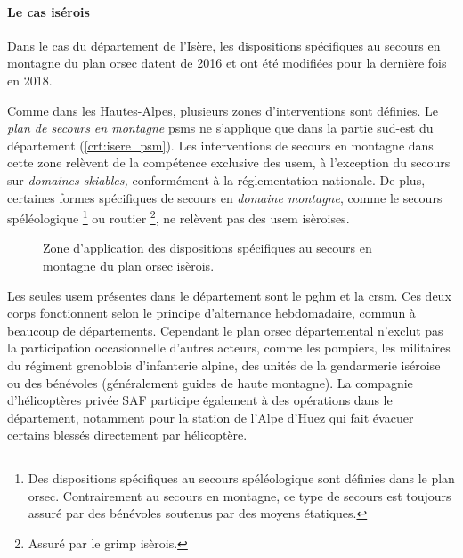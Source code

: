 \paragraph{Le cas isérois}

Dans le cas du département de l'Isère, les dispositions spécifiques au
secours en montagne du plan \ac{orsec} datent de 2016 et ont été
modifiées pour la dernière fois en 2018.

Comme dans les Hautes-Alpes, plusieurs zones d'interventions sont
définies. Le \emph{plan de secours en montagne} \acp{psm} ne
s'applique que dans la partie sud-est du département
(\autoref{crt:isere_psm}). Les interventions de secours en montagne
dans cette zone relèvent de la compétence exclusive des \ac{usem}, à
l'exception du secours sur \emph{domaines skiables,} conformément à la
réglementation nationale. De plus, certaines formes spécifiques de
secours en \emph{domaine montagne}, comme le secours spéléologique
\footnote{Des dispositions spécifiques au secours spéléologique sont
  définies dans le plan \ac{orsec}. Contrairement au secours en
  montagne, ce type de secours est toujours assuré par des bénévoles
  soutenus par des moyens étatiques.} ou routier \footnote{Assuré par
  le \ac{grimp} isèrois.}, ne relèvent pas des \ac{usem} isèroises.

\begin{figure}
  \centering
  
  \caption{Zone d'application des dispositions spécifiques au secours
    en montagne du plan \ac{orsec} isèrois.}
  \label{crt:isere_psm}
\end{figure}

Les seules \ac{usem} présentes dans le département sont le \ac{pghm}
et la \ac{crsm}. Ces deux corps fonctionnent selon le principe
d'alternance hebdomadaire, commun à beaucoup de
départements. Cependant le plan \ac{orsec} départemental n’exclut pas
la participation occasionnelle d'autres acteurs, comme les pompiers,
les militaires du régiment grenoblois d’infanterie alpine, des unités
de la gendarmerie iséroise ou des bénévoles (généralement guides de
haute montagne).
La compagnie d'hélicoptères privée SAF participe également à des
opérations dans le département, notamment pour la station de l'Alpe
d'Huez qui fait évacuer certains blessés directement par hélicoptère.

